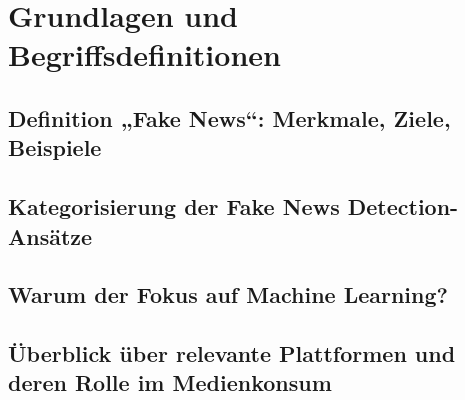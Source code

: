 \chapter{Grundlagen und Begriffsdefinitionen}
\label{chap:grundlagen_und_begriffsdefinitionen}

\section{Definition „Fake News“: Merkmale, Ziele, Beispiele}
\label{sec:definition_fake_news}

\section{Kategorisierung der Fake News Detection-Ansätze}
\label{sec:kategorisierung_fake_news_detection_ansätze}

\section{Warum der Fokus auf Machine Learning?}
\label{sec:warum_fokus_machine_learning}

\section{Überblick über relevante Plattformen und deren Rolle im Medienkonsum}
\label{sec:plattformen_und_medienkonsum}

